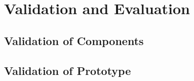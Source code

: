 \chapter{Validation and Evaluation}
\label{chap:evaluation}

\section{Validation of Components}
\label{sec:validationofcomponents}




\section{Validation of Prototype}
\label{sec:validationofprototype}
